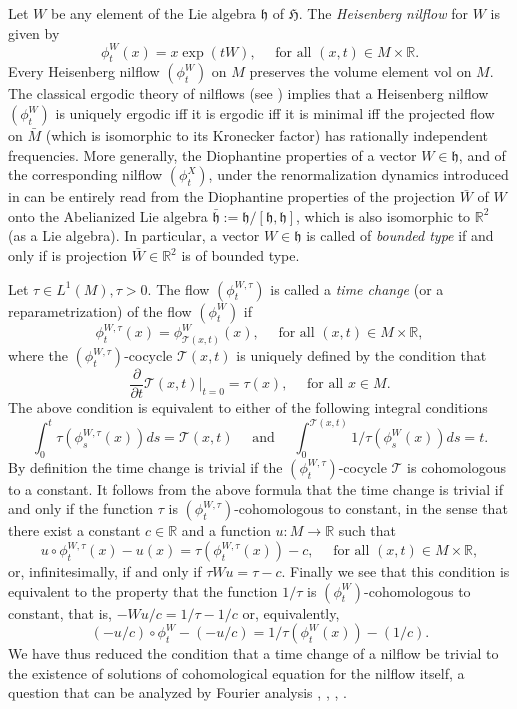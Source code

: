 \documentclass[JEP,XML,SOM,Unicode,NoEqCountersInSection]{cedram}
\let\mathcal\mathscr
\newcommand{\vol}{\mathrm{vol}}
\theoremstyle{definition}
\theoremstyle{plain}
\newcommand\RR{\mathbb{R}}
\begin{document}
Let $W$ be any element of the Lie algebra $\mathfrak h$ of $\mathfrak H$. The \emph{Heisenberg nilflow} for $W$ is given by
\[
\phi^W_t(x)=x\exp(tW), \quad \text{ for all } (x,t)\in M\times \RR.
\]
Every Heisenberg nilflow $(\phi^W_t)$ on $M$ preserves the volume element $\vol$ on $M$.
The classical ergodic theory of nilflows (see \cite{AGH}) implies that a Heisenberg nilflow $(\phi^W_t)$ is uniquely ergodic iff it is ergodic iff it is minimal iff the
projected flow on $\bar M$ (which is isomorphic to its Kronecker factor) has rationally independent frequencies.
More generally, the Diophantine properties of a vector $W\in \mathfrak h$, and of the corresponding nilflow $(\phi^X_t)$, under the renormalization dynamics
introduced in \cite{FlaFo1} can be entirely read from the Diophantine properties of the projection $\bar W$ of $W$ onto the Abelianized Lie algebra
$\bar {\mathfrak h} := \mathfrak h/[\mathfrak h,\mathfrak h]$, which is also isomorphic to $\RR^2$ (as a Lie algebra). In particular, a vector $W\in \mathfrak h$ is
called of \emph{bounded type} if and only if is projection $\bar W \in \RR^2$ is of bounded type.

Let $\tau\in L^1(M), \tau>0$. The flow $(\phi_t^{W,\tau})$ is called a \emph{time change} (or a reparametrization) of the flow $(\phi_t^W)$ if
\[
\phi_t^{W,\tau}(x)=\phi^W_{\mathcal T(x,t)}(x), \quad \text{ for all } (x,t) \in M\times \RR,
\]
where the $(\phi^{W, \tau}_t)$-cocycle $\mathcal T(x,t)$ is uniquely defined by the condition that
\[
\frac{\partial}{\partial t} {\mathcal T}(x, t) \vert _{t=0} = \tau (x), \quad \text{ for all } x\in M.
\]
The above condition is equivalent to either of the following integral conditions
\[
\int_{0}^{t} \tau(\phi_s^{W, \tau}(x))ds= \mathcal T (x,t)\quad \text{ and } \quad \int_{0}^{\mathcal T (x,t)} 1/\tau(\phi_s^W(x))ds=t.
\]
By definition the time change is trivial if the $(\phi^{W,\tau}_t)$-cocycle $\mathcal T$ is cohomologous to a constant. It follows from the above formula that the time change is trivial if and only if the function $\tau$
is $(\phi^{W, \tau}_t)$-cohomologous to constant, in the sense that there exist a constant
$c\in \RR$ and a function $u:M\to \RR$ such that
\[
u \circ \phi^{W, \tau} _t(x) - u(x) = \tau(\phi_t^{W,\tau}(x)) -c, \quad \text{ for all } (x,t)\in M\times \RR,
\]
or, infinitesimally, if and only if $ \tau W u = \tau - c$. Finally we see that this condition is equivalent to
the property that the function $1/\tau$ is $(\phi^{W}_t)$-cohomologous to constant, that is, $ -W u/c=1/\tau-1/c$
or, equivalently,
\[
(-u/c) \circ \phi^W _t - (-u/c) = 1/\tau(\phi_t^{W}(x)) - (1/c).
\]
We have thus reduced the condition that a time change of a nilflow be trivial to the existence of solutions of cohomological equation for the nilflow itself, a question that can be analyzed by Fourier analysis \cite{Katok:CC},
\cite{FlaFo1}, \cite{AFU}, \cite{FoSurvey}.
\end{document}
